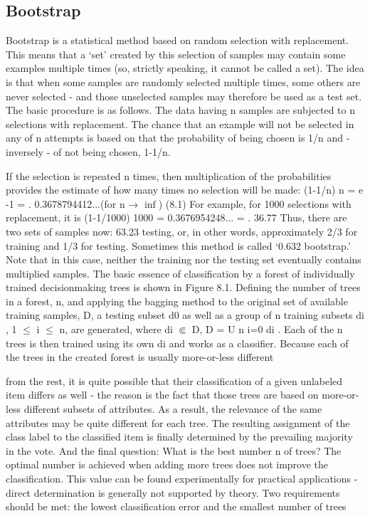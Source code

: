 \documentclass[11pt,openany,executivepaper]{book}
\begin{document}
\subsection{Bootstrap}

Bootstrap is a statistical method based on random selection with replacement.
This means that a ‘set’ created by this selection of samples may contain some
examples multiple times (so, strictly speaking, it cannot be called a set).
The idea is that when some samples are randomly selected multiple times,
some others are never selected - and those unselected samples may therefore be
used as a test set.
The basic procedure is as follows. The data having n samples are subjected to
n selections with replacement. The chance that an example will not be selected
in any of n attempts is based on that the probability of being chosen is 1/n and -
inversely - of not being chosen, 1-1/n.

If the selection is repeated n times, then multiplication of the probabilities
provides the estimate of how many times no selection will be made:
(1-1/n)
n = e
-1 =
.
0.3678794412...(for n → $\inf$) (8.1)
For example, for 1000 selections with replacement, it is (1-1/1000)
1000 =
0.3676954248... =
.
36.77%
Thus, there are two sets of samples now: 63.23%
testing, or, in other words, approximately 2/3 for training and 1/3 for testing.
Sometimes this method is called ‘0.632 bootstrap.’ Note that in this case, neither
the training nor the testing set eventually contains multiplied samples.
The basic essence of classification by a forest of individually trained decisionmaking trees is shown in Figure 8.1. Defining the number of trees in a forest,
n, and applying the bagging method to the original set of available training samples, D, a testing subset d0 as well as a group of n training subsets di
, 1 $\leq$ i $\leq$ n,
are generated, where di $\Subset$ D, D = U
n
i=0
di
.
Each of the n trees is then trained using its own di and works as a classifier.
Because each of the trees in the created forest is usually more-or-less different

from the rest, it is quite possible that their classification of a given unlabeled item
differs as well - the reason is the fact that those trees are based on more-or-less
different subsets of attributes. As a result, the relevance of the same attributes
may be quite different for each tree. The resulting assignment of the class label
to the classified item is finally determined by the prevailing majority in the vote.
And the final question: What is the best number n of trees? The optimal number is achieved when adding more trees does not improve the classification. This
value can be found experimentally for practical applications - direct determination is generally not supported by theory. Two requirements should be met: the
lowest classification error and the smallest number of trees
\end{document}
